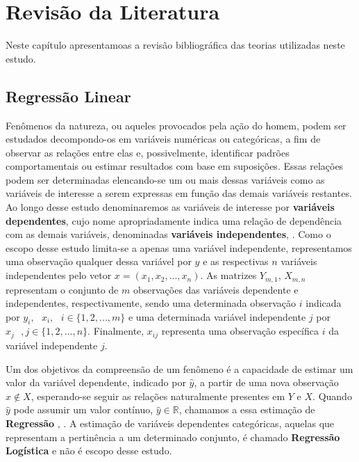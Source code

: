 \pagestyle{empty}
\cleardoublepage
\pagestyle{fancy}

\chapter{Revisão da Literatura}\label{chap:revisao}

Neste capítulo apresentamoas a revisão bibliográfica das teorias utilizadas neste estudo. 


\section{Regressão Linear}\label{sec:regressao_linear}

Fenômenos da natureza, ou aqueles provocados pela ação do homem, podem ser estudados decompondo-os em variáveis numéricas ou categóricas, a fim de observar as relações entre elas e, possivelmente, identificar padrões comportamentais ou estimar resultados com base em suposições. Essas relações podem ser determinadas elencando-se um ou mais dessas variáveis como as variáveis de interesse a serem expressas em função das demais variáveis restantes.  Ao longo desse estudo denominaremos as variáveis de interesse por \textbf{variáveis dependentes}, cujo nome apropriadamente indica uma relação de dependência com as demais variáveis, denominadas \textbf{variáveis independentes}, \cite[p.2]{Andersen}. Como o escopo desse estudo limita-se a apenas uma variável independente, representamos uma observação qualquer dessa variável por $ y $ e as respectivas $ n $ variáveis independentes pelo vetor $ x = (x_1, x_2, ..., x_n) $.  As matrizes $ Y_{m,1} $, $ X_{m,n} $ representam o conjunto de $ m $ observações das variáveis dependente e independentes, respectivamente, sendo uma determinada observação $ i $ indicada por $ y_i,\text{ }x_i,\text{ }i\in \{1,2,...,m\} $ e uma determinada variável independente $ j $ por $ x_{j}\text{ }, j\in\{1,2,...,n\} $. Finalmente, $ x_{ij} $ representa uma observação específica $ i $ da variável independente $ j $.


Um dos objetivos da compreensão de um fenômeno é a capacidade de estimar um valor da variável dependente, indicado por $ \hat{y} $, a partir de uma nova observação $ x \notin X$, esperando-se seguir as relações naturalmente presentes em $ Y $ e $ X $. Quando $ \hat{y} $  pode assumir um valor contínuo, $ \hat{y} \in \mathbb{R} $, chamamos a essa estimação de \textbf{Regressão} \cite[p.3]{Bishop}, \cite[p.4]{Hastie}. A estimação de variáveis dependentes categóricas, aquelas que representam a pertinência a um determinado conjunto, é chamado \textbf{Regressão Logística} e não é escopo desse estudo. 


